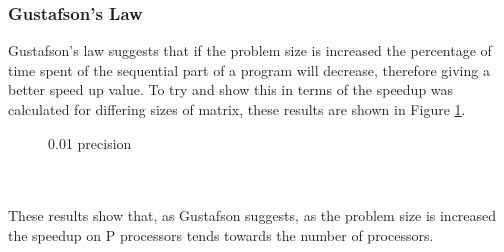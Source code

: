 \documentclass{article}
\begin{document}
\subsubsection{Gustafson’s Law}

Gustafson's law suggests that if the problem size is increased the percentage of time
spent of the sequential part of a program will decrease, therefore giving a better
speed up value. To try and show this in terms of the speedup was calculated for
differing sizes of matrix, these results are shown in Figure \ref{fig:gustafson}.

\begin{figure}[H]
 \centering
 \caption{0.01 precision}
 \label{fig:gustafson}
\end{figure}\\~\\

These results show that, as Gustafson suggests, as the problem size is increased
the speedup on P processors tends towards the number of processors. 
\end{document}
